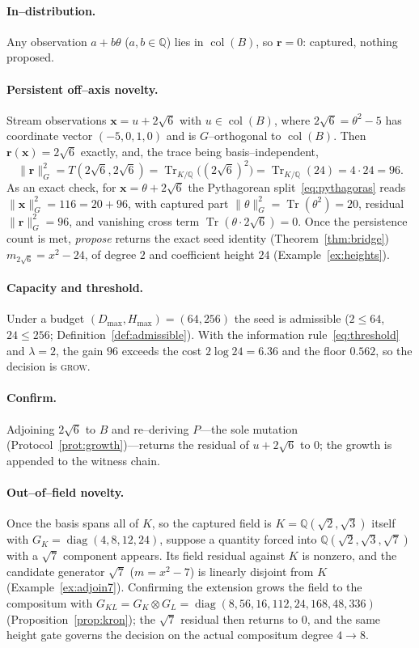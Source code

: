 \documentclass[11pt]{article}
\theoremstyle{plain}
\theoremstyle{definition}
\theoremstyle{remark}
\newcommand{\Q}{\mathbb{Q}}
\newcommand{\K}{K}
\newcommand{\Tr}{\operatorname{Tr}}
\newcommand{\rr}{\mathbf{r}}
\newcommand{\xx}{\mathbf{x}}
\newcommand{\GG}{G}
\newcommand{\BB}{B}
\DeclareMathOperator{\col}{col}
\DeclareMathOperator{\diag}{diag}
\begin{document}
\paragraph{In--distribution.} Any observation $a+b\theta$ ($a,b\in\Q$) lies in $\col(\BB)$, so $\rr=0$:
captured, nothing proposed.

\paragraph{Persistent off--axis novelty.} Stream observations $\xx=u+2\sqrt6$ with $u\in\col(\BB)$, where
$2\sqrt6=\theta^2-5$ has coordinate vector $(-5,0,1,0)$ and is $\GG$--orthogonal to $\col(\BB)$. Then
$\rr(\xx)=2\sqrt6$ exactly, and, the trace being basis--independent,
\[
  \lVert\rr\rVert_{\GG}^2=T(2\sqrt6,2\sqrt6)=\Tr_{\K/\Q}\!\big((2\sqrt6)^2\big)=\Tr_{\K/\Q}(24)=4\cdot24=96 .
\]
As an exact check, for $\xx=\theta+2\sqrt6$ the Pythagorean split~\eqref{eq:pythagoras} reads
$\lVert\xx\rVert_{\GG}^2=116=20+96$, with captured part $\lVert\theta\rVert_{\GG}^2=\Tr(\theta^2)=20$,
residual $\lVert\rr\rVert_{\GG}^2=96$, and vanishing cross term $\Tr(\theta\cdot 2\sqrt6)=0$.
Once the persistence count is met, \emph{propose} returns the exact seed identity (Theorem~\ref{thm:bridge})
$m_{2\sqrt6}=x^2-24$, of degree $2$ and coefficient height $24$ (Example~\ref{ex:heights}).

\paragraph{Capacity and threshold.} Under a budget $(D_{\max},H_{\max})=(64,256)$ the seed is admissible
($2\le 64$, $24\le 256$; Definition~\ref{def:admissible}). With the information rule~\eqref{eq:threshold} and
$\lambda=2$, the gain $96$ exceeds the cost $2\log24=6.36$ and the floor $0.562$, so the decision is
\textsc{grow}.

\paragraph{Confirm.} Adjoining $2\sqrt6$ to $\BB$ and re--deriving $P$---the sole mutation
(Protocol~\ref{prot:growth})---returns the residual of $u+2\sqrt6$ to $0$; the growth is appended to the
witness chain.

\paragraph{Out--of--field novelty.} Once the basis spans all of $\K$, so the captured field is
$\K=\Q(\sqrt2,\sqrt3)$ itself with $\GG_\K=\diag(4,8,12,24)$, suppose a quantity forced into
$\Q(\sqrt2,\sqrt3,\sqrt7)$ with a $\sqrt7$ component appears. Its field residual against $\K$ is nonzero, and
the candidate generator $\sqrt7$ ($m=x^2-7$) is linearly disjoint from $\K$ (Example~\ref{ex:adjoin7}).
Confirming the extension grows the field to the compositum with $\GG_{\K L}=\GG_\K\otimes\GG_L
=\diag(8,56,16,112,24,168,48,336)$ (Proposition~\ref{prop:kron}); the $\sqrt7$ residual then returns to $0$,
and the same height gate governs the decision on the actual compositum degree $4\to8$.
\end{document}
